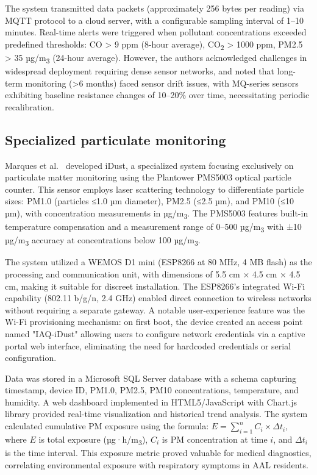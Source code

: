 \documentclass[12pt]{report}
\begin{document}
The system transmitted data packets (approximately 256 bytes per reading) via MQTT protocol to a cloud server, with a configurable sampling interval of 1--10 minutes. Real-time alerts were triggered when pollutant concentrations exceeded predefined thresholds: CO > 9 ppm (8-hour average), CO\textsubscript{2} > 1000 ppm, PM2.5 > 35 µg/m\textsubscript{3} (24-hour average). However, the authors acknowledged challenges in widespread deployment requiring dense sensor networks, and noted that long-term monitoring (>6 months) faced sensor drift issues, with MQ-series sensors exhibiting baseline resistance changes of 10--20\% over time, necessitating periodic recalibration.

\subsection{Specialized particulate monitoring}
Marques et al.~\cite{marques2018} developed iDust, a specialized system focusing exclusively on particulate matter monitoring using the Plantower PMS5003 optical particle counter. This sensor employs laser scattering technology to differentiate particle sizes: PM1.0 (particles ≤1.0 µm diameter), PM2.5 (≤2.5 µm), and PM10 (≤10 µm), with concentration measurements in µg/m\textsubscript{3}. The PMS5003 features built-in temperature compensation and a measurement range of 0--500 µg/m\textsubscript{3} with ±10 µg/m\textsubscript{3} accuracy at concentrations below 100 µg/m\textsubscript{3}.

The system utilized a WEMOS D1 mini (ESP8266 at 80 MHz, 4 MB flash) as the processing and communication unit, with dimensions of 5.5 cm × 4.5 cm × 4.5 cm, making it suitable for discreet installation. The ESP8266's integrated Wi-Fi capability (802.11 b/g/n, 2.4 GHz) enabled direct connection to wireless networks without requiring a separate gateway. A notable user-experience feature was the Wi-Fi provisioning mechanism: on first boot, the device created an access point named "IAQ-iDust" allowing users to configure network credentials via a captive portal web interface, eliminating the need for hardcoded credentials or serial configuration.

Data was stored in a Microsoft SQL Server database with a schema capturing timestamp, device ID, PM1.0, PM2.5, PM10 concentrations, temperature, and humidity. A web dashboard implemented in HTML5/JavaScript with Chart.js library provided real-time visualization and historical trend analysis. The system calculated cumulative PM exposure using the formula: $E = \sum_{i=1}^{n} C_i \times \Delta t_i$, where $E$ is total exposure (µg·h/m\textsubscript{3}), $C_i$ is PM concentration at time $i$, and $\Delta t_i$ is the time interval. This exposure metric proved valuable for medical diagnostics, correlating environmental exposure with respiratory symptoms in AAL residents.
\end{document}
